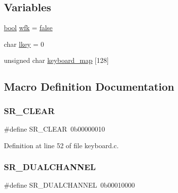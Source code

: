 \subsection*{Variables}
\begin{DoxyCompactItemize}
\item 
\hyperlink{a00140_af6a258d8f3ee5206d682d799316314b1_af6a258d8f3ee5206d682d799316314b1}{bool} \hyperlink{a00038_a6ddd5223379778858edc46ffbec19775_a6ddd5223379778858edc46ffbec19775}{wfk} = \hyperlink{a00140_af6a258d8f3ee5206d682d799316314b1_af6a258d8f3ee5206d682d799316314b1ae9de385ef6fe9bf3360d1038396b884c}{false}
\item 
char \hyperlink{a00038_ade374650022cb30c4f5591a8dafad685_ade374650022cb30c4f5591a8dafad685}{lkey} = 0
\item 
unsigned char \hyperlink{a00038_a5d0b5e007d1b57bf84d1c03439810533_a5d0b5e007d1b57bf84d1c03439810533}{keyboard\+\_\+map} \mbox{[}128\mbox{]}
\end{DoxyCompactItemize}


\subsection{Macro Definition Documentation}
\mbox{\label{a00038_a8aa66e8bc828742fb4819d7cd2df598d_a8aa66e8bc828742fb4819d7cd2df598d}} 
\subsubsection{\texorpdfstring{S\+R\+\_\+\+C\+L\+E\+AR}{SR\_CLEAR}}
{\footnotesize\ttfamily \#define S\+R\+\_\+\+C\+L\+E\+AR~0b00000010}



Definition at line 52 of file keyboard.\+c.

\mbox{\label{a00038_addafe32b109f94a57ae4bf1a1dca05e0_addafe32b109f94a57ae4bf1a1dca05e0}} 
\subsubsection{\texorpdfstring{S\+R\+\_\+\+D\+U\+A\+L\+C\+H\+A\+N\+N\+EL}{SR\_DUALCHANNEL}}
{\footnotesize\ttfamily \#define S\+R\+\_\+\+D\+U\+A\+L\+C\+H\+A\+N\+N\+EL~0b00010000}



